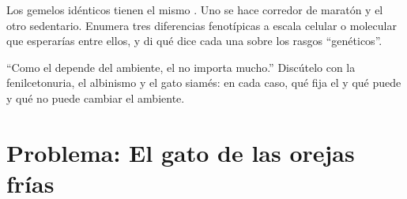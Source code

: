 \begin{exercise}[$\star\star\star$]\label{exo:g11:enzymes-and-phenotype:14}
Los gemelos idénticos tienen el mismo . Uno se hace corredor de
maratón y el otro sedentario. Enumera tres diferencias fenotípicas a
escala celular o molecular que esperarías entre ellos, y di qué dice
cada una sobre los rasgos ``genéticos''.
\end{exercise}

\begin{exercise}[$\star\star\star$]\label{exo:g11:enzymes-and-phenotype:15}
``Como el  depende del ambiente, el  no importa
mucho.'' Discútelo con la fenilcetonuria, el albinismo y el gato
siamés: en cada caso, qué fija el  y qué puede y qué no puede
cambiar el ambiente.
\end{exercise}

\section{Problema: El gato de las orejas frías}

